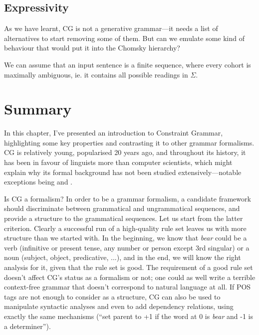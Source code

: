 \subsection{Expressivity}
\label{sec:expressivity}
As we have learnt, CG is not a generative grammar---it needs a list of alternatives to start removing some of them.
But can we emulate some kind of behaviour that would put it into the Chomsky hierarchy?

We can assume that an input sentence is a finite sequence, where every cohort is maximally ambiguous, ie. it contains all possible readings in $\Sigma$.



\section{Summary}

In this chapter, I've presented an introduction to Constraint Grammar,
highlighting some key properties and contrasting it to other grammar
formalisms.
CG is relatively young, popularised 20 years ago, and throughout its
history, it has been in favour of linguists more than computer
scientists, which might explain why its formal background has not been
studied extensively---notable exceptions being \cite{lager98} and \cite{lager_nivre01}.
 
Is CG a formalism? In order to be a grammar formalism, a candidate
framework should discriminate between grammatical and ungrammatical
sequences, and provide a structure to the grammatical sequences.
Let us start from the latter criterion. Clearly a successful run of a
high-quality rule set leaves us with more structure than we started
with. In the beginning, we know that \emph{bear} could be a verb
(infinitive or present tense, any number or person except 3rd
singular) or a noun (subject, object, predicative, ...), and in the end, we
will know the right analysis for it, given that the rule set is
good. The requirement of a good rule set doesn't affect CG's status as
a formalism or not; one could as well write a terrible context-free
grammar that doesn't correspond to natural language at all.
If POS tags are not enough to consider as a structure,
CG can also be used to manipulate syntactic analyses and even to add
dependency relations, using exactly the same mechanisms (``set parent to +1 if the word at 0 is \emph{bear} and -1 is a determiner'').

